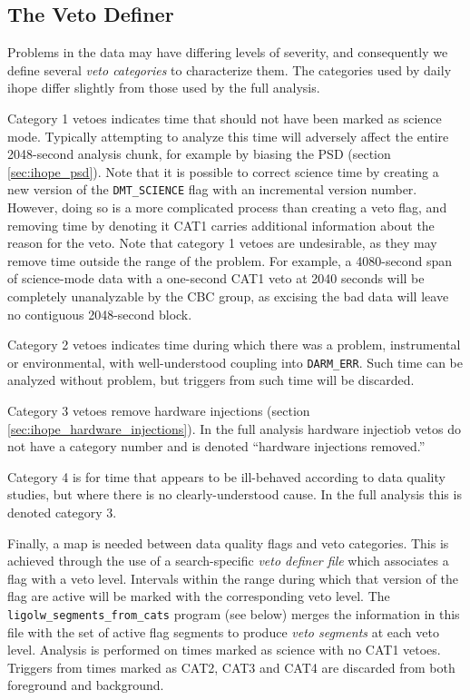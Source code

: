\subsection{The Veto Definer}

Problems in the data may have differing levels of severity, and
consequently we define several \emph{veto categories} to characterize
them.  The categories used by daily ihope differ slightly from those
used by the full analysis.

Category 1 vetoes indicates time that should not have been marked as
science mode.  Typically attempting to analyze this time will
adversely affect the entire 2048-second analysis chunk, for example by
biasing the PSD (section \ref{sec:ihope_psd}).  Note that it is
possible to correct science time by creating a new version of the
\texttt{DMT\_SCIENCE} flag with an incremental version number.
However, doing so is a more complicated process than creating a veto
flag, and removing time by denoting it CAT1 carries additional
information about the reason for the veto.  Note that category 1
vetoes are undesirable, as they may remove time outside the range of
the problem.  For example, a 4080-second span of science-mode data
with a one-second CAT1 veto at 2040 seconds will be completely
unanalyzable by the CBC group, as excising the bad data will leave no
contiguous 2048-second block.

Category 2 vetoes indicates time during which there was a problem,
instrumental or environmental, with well-understood coupling into
\texttt{DARM\_ERR}.  Such time can be analyzed without problem, but
triggers from such time will be discarded. 

Category 3 vetoes remove hardware injections (section
\ref{sec:ihope_hardware_injections}).  In the full analysis hardware
injectiob vetos do not have a category number and is denoted
``hardware injections removed.''

Category 4 is for time that appears to be ill-behaved according to 
data quality studies, but where there is no clearly-understood 
cause.  In the full analysis this is denoted category 3.

Finally, a map is needed between data quality flags and veto
categories.  This is achieved through the use of a search-specific
\emph{veto definer file} which associates a flag with a veto level.
Intervals within the range during which that version of the flag are
active will be marked with the corresponding veto level.  The
\texttt{ligolw\_segments\_from\_cats} program (see below) merges the
information in this file with the set of active flag segments to produce
\emph{veto segments} at each veto level.  Analysis is performed on
times marked as science with no CAT1 vetoes.  Triggers from times
marked as CAT2, CAT3 and CAT4 are discarded from both foreground and
background.

